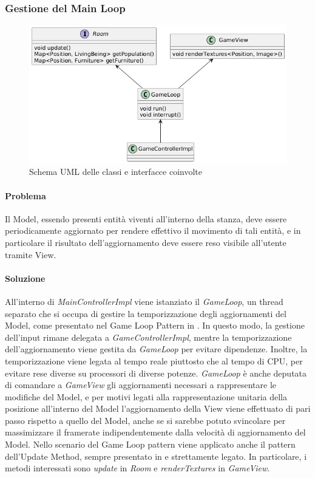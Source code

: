 \documentclass[a4paper,12pt]{report}
\begin{document}
\subsubsection{Gestione del Main Loop}
\begin{figure}[H]
	\centering
	\includegraphics[width=\textwidth]{img/game-loop.png}
	\caption{Schema UML delle classi e interfacce coinvolte}
	\label{img:game-loop}
\end{figure}
\paragraph{Problema} Il Model, essendo presenti entità viventi all'interno della stanza, deve essere periodicamente aggiornato per rendere effettivo il movimento di tali entità, e in particolare il risultato dell'aggiornamento deve essere reso visibile all'utente tramite View.
\paragraph{Soluzione} All'interno di \textit{MainControllerImpl} viene istanziato il \textit{GameLoop}, un thread separato che si occupa di gestire la temporizzazione degli aggiornamenti del Model, come presentato nel Game Loop Pattern in \cite{nystrom2014}. In questo modo, la gestione dell'input rimane delegata a \textit{GameControllerImpl}, mentre la temporizzazione dell'aggiornamento viene gestita da \textit{GameLoop} per evitare dipendenze. Inoltre, la temporizzazione viene legata al tempo reale piuttosto che al tempo di CPU, per evitare rese diverse su processori di diverse potenze. \textit{GameLoop} è anche deputata di comandare a \textit{GameView} gli aggiornamenti necessari a rappresentare le modifiche del Model, e per motivi legati alla rappresentazione unitaria della posizione all'interno del Model l'aggiornamento della View viene effettuato di pari passo rispetto a quello del Model, anche se si sarebbe potuto svincolare per massimizzare il framerate indipendentemente dalla velocità di aggiornamento del Model. 
\newline Nello scenario del Game Loop pattern viene applicato anche il pattern dell'Update Method, sempre presentato in \cite{nystrom2014} e strettamente legato. In particolare, i metodi interessati sono \textit{update} in \textit{Room} e \textit{renderTextures} in \textit{GameView}.
\end{document}

